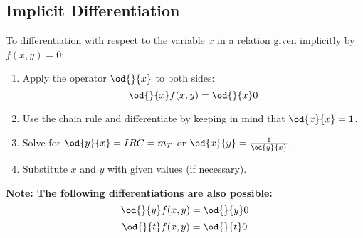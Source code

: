 \subsection{Implicit Differentiation}
	To differentiation with respect to the variable $x$ in a relation given implicitly by $f(x,y) = 0$:
	\begin{enumerate}
		\item Apply the operator $\od{}{x}$ to both sides: \[\od{}{x} f(x,y) = \od{}{x} 0\]
		\item Use the chain rule and differentiate by keeping in mind that $\od{x}{x} = 1$.
		\item Solve for $\od{y}{x} = IRC = m_T$ or $\od{x}{y} = \frac{1}{\od{y}{x}}$.
		\item Substitute $x$ and $y$ with given values (if necessary).
	\end{enumerate}
	\textbf{Note: The following differentiations are also possible:}
	\[\od{}{y} f(x,y) = \od{}{y}0\]
	\[\od{}{t} f(x,y) = \od{}{t}0\]
